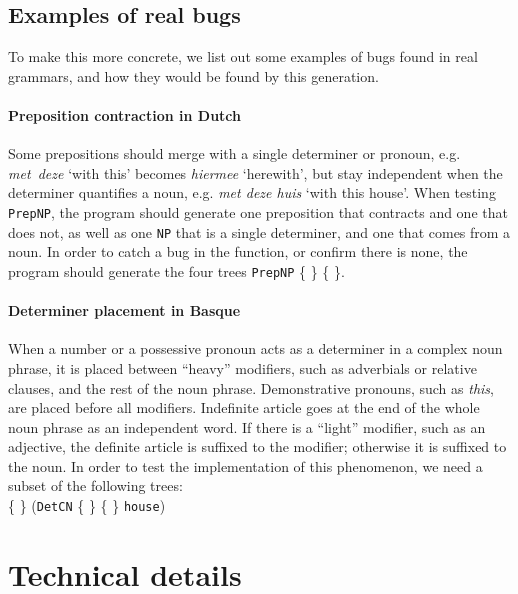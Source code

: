 \documentclass[11pt]{article}
\def\t#1{\texttt{#1}}
\newcommand{\tts}[1]{{\tt \small #1}}
\begin{document}
\subsection{Examples of real bugs} 
To make this more concrete, we list out some examples of bugs found in real grammars, and how they would be found by this generation.

\paragraph{Preposition contraction in Dutch} Some prepositions should merge with a single determiner or pronoun, e.g. \emph{met~deze} `with this' becomes \emph{hiermee} `herewith', but stay independent when the determiner quantifies a noun, e.g. \emph{met deze huis} `with this house'. When testing \t{PrepNP}, the program should generate one preposition that contracts and one that does not, as well as one \t{NP} that is a single determiner, and one that comes from a noun. 
In order to catch a bug in the function, or confirm there is none, the program should generate the four trees
\t{PrepNP} \{  \} \{  \}. 

\paragraph{Determiner placement in Basque} When a number or a possessive pronoun acts as a determiner in a complex noun phrase, it is placed
between ``heavy'' modifiers, such as adverbials or relative clauses, and the rest of the noun phrase. Demonstrative pronouns, such as \emph{this},
 are placed before all modifiers. Indefinite article goes at the end of the whole noun phrase as an independent word.
If there is a ``light'' modifier, such as an adjective, the definite article is suffixed to the modifier; otherwise it is suffixed to the noun.
In order to test the implementation of this phenomenon, we need a subset of the following trees: \\
\{   \}  (\t{DetCN} \{ \stackanchor{\stackanchor{\tts{a}}{\tts{the}}}{\stackanchor{\tts{this}}{\tts{your}}} \} \{  \} {\tt house})





\section{Technical details}
\label{sec:details}
\end{document}
